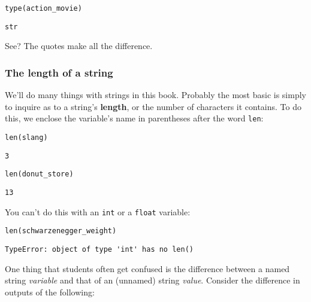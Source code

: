 \begin{Verbatim}[fontsize=\small,samepage=true,frame=single,framesep=3mm]
type(action_movie)
\end{Verbatim}
\begin{Verbatim}[fontsize=\small,samepage=true,frame=leftline,framesep=5mm,framerule=1mm]
str
\end{Verbatim}

See? The quotes make all the difference.

\subsubsection{The length of a string}

We'll do many things with strings in this book. Probably the most basic is
simply to inquire as to a string's \textbf{length}, or the number of characters
it contains. To do this, we enclose the variable's name in parentheses after
the word \texttt{len}:

\begin{Verbatim}[fontsize=\small,samepage=true,frame=single,framesep=3mm]
len(slang)
\end{Verbatim}
\begin{Verbatim}[fontsize=\small,samepage=true,frame=leftline,framesep=5mm,framerule=1mm]
3
\end{Verbatim}

\begin{Verbatim}[fontsize=\small,samepage=true,frame=single,framesep=3mm]
len(donut_store)
\end{Verbatim}
\begin{Verbatim}[fontsize=\small,samepage=true,frame=leftline,framesep=5mm,framerule=1mm]
13
\end{Verbatim}

You can't do this with an \texttt{int} or a \texttt{float} variable:

\begin{Verbatim}[fontsize=\small,samepage=true,frame=single,framesep=3mm]
len(schwarzenegger_weight)
\end{Verbatim}

\begin{Verbatim}[fontsize=\small,samepage=true,frame=leftline,framesep=5mm,framerule=1mm]
TypeError: object of type 'int' has no len()
\end{Verbatim}

One thing that students often get confused is the difference between a named
string \textit{variable} and that of an (unnamed) string \textit{value}.
Consider the difference in outputs of the following:

